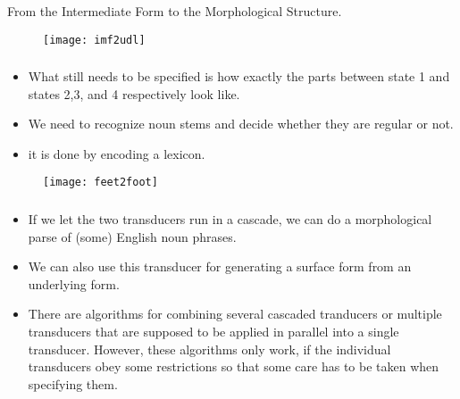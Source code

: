 \begin{frame}

	\frametitle{\insertsection}
	\framesubtitle{\insertsubsection}
	
	From the Intermediate Form to the Morphological Structure.
	
	\begin{figure}
		\texttt{[image: imf2udl]}
	\end{figure}

\end{frame}


\begin{frame}

	\frametitle{\insertsection}
	\framesubtitle{\insertsubsection}
	
	\begin{itemize}
		\item What still needs to be specified is how exactly the parts between state 1 and states 2,3, and 4 respectively look like.
		\item We need to recognize noun stems and decide whether they are regular or not.
		\item it is done by encoding a lexicon.
	\end{itemize}
	
	\begin{figure}
		\texttt{[image: feet2foot]}
	\end{figure}

\end{frame}


\begin{frame}

	\frametitle{\insertsection}
	\framesubtitle{\insertsubsection}
	
	\begin{itemize}
		\item If we let the two transducers run in a cascade, we can do a morphological parse of (some) English noun phrases.
		\item We can also use this transducer for generating a surface form from an underlying form.
		\item There are algorithms for combining several cascaded tranducers or multiple transducers that are supposed to be applied in parallel into a single transducer. However, these algorithms only work, if the individual transducers obey some restrictions so that some care has to be taken when specifying them.
	\end{itemize}
	
\end{frame}


